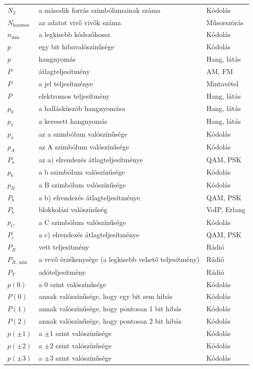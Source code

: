 {\begin{longtable}{@{}>{\raggedright\arraybackslash}p{2.4cm}>{\raggedright\arraybackslash}p{8.2cm}>{\raggedright\arraybackslash}p{3.8cm}@{}}
$N_2$ & a második forrás szimbólumainak száma & Kódolás\\
$N_\text{hasznos}$ & az adatot vivő vivők száma & Műsorszórás\\
$n_{\min}$ & a legkisebb kódszóhossz & Kódolás\\
$p$ & egy bit hibavalószínűsége & Kódolás\\
$p$ & hangnyomás & Hang, látás\\
$P$ & átlagteljesítmény & AM, FM\\
$P$ & a jel teljesítménye & Mintavétel\\
$P$ & elektromos teljesítmény & Hang, látás\\
$p_0$ & a hallásküszöb hangnyomása & Hang, látás\\
$p_1$ & a keresett hangnyomás & Hang, látás\\
$p_a$ & az a szimbólum valószínűsége & Kódolás\\
$p_A$ & az A szimbólum valószínűsége & Kódolás\\
$P_a$ & az a) elrendezés átlagteljesítménye & QAM, PSK\\
$p_b$ & a b szimbólum valószínűsége & Kódolás\\
$p_B$ & a B szimbólum valószínűsége & Kódolás\\
$P_b$ & a b) elrendezés átlagteljesítménye & QAM, PSK\\
$P_b$ & blokkolási valószínűség & VoIP, Erlang\\
$p_C$ & a C szimbólum valószínűsége & Kódolás\\
$P_c$ & a c) elrendezés átlagteljesítménye & QAM, PSK\\
$P_R$ & vett teljesítmény & Rádió\\
$P_{R,\min}$ & a vevő érzékenysége (a legkisebb vehető teljesítmény) & Rádió\\
$P_T$ & adóteljesítmény & Rádió\\
$p(0)$ & a 0 szint valószínűsége & Kódolás\\
$P(0)$ & annak valószínűsége, hogy egy bit sem hibás & Kódolás\\
$P(1)$ & annak valószínűsége, hogy pontosan 1 bit hibás & Kódolás\\
$P(2)$ & annak valószínűsége, hogy pontosan 2 bit hibás & Kódolás\\
$p(\pm1)$ & a $\pm$1 szint valószínűsége & Kódolás\\
$p(\pm2)$ & a $\pm$2 szint valószínűsége & Kódolás\\
$p(\pm3)$ & a $\pm$3 szint valószínűsége & Kódolás\\

\end{longtable}}
